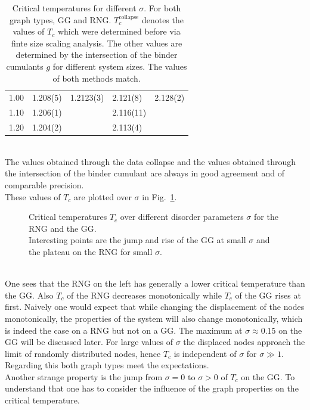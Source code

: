 \begin{table}[htbp]
\begin{tabular}{l l l l l}
            1.00 & 1.208(5) & 1.2123(3)& 2.121(8) & 2.128(2)\\
            1.10 & 1.206(1) &          & 2.116(11)&         \\
            1.20 & 1.204(2) &          & 2.113(4) &         \\
            \bottomrule
        \end{tabular}
        \caption[Critical Temperatures for Different $\sigma$]{
            Critical temperatures for different $\sigma$. For both graph
            types, GG and RNG. \(T_c^{\mathrm{collapse}}\) denotes the
            values of \(T_c\) which were determined before via finte
            size scaling analysis. The other values are determined by
            the intersection of the binder cumulants \(g\) for different
            system sizes. The values of both methods match.
        }
        \label{tab:critTemp}
    \end{table}\\
    The values obtained through the data collapse and the values obtained
    through the intersection of the binder cumulant are always in good
    agreement and of comparable precision.\\
    These values of \(T_c\) are plotted over \(\sigma\) in Fig.\ \ref{fig:Tc}.
    \begin{figure}[htbp]
        \centering
        \caption[Critical Temperature over Different Disorder Parameters]
        {
            Critical temperatures \(T_c\) over different
            disorder parameters \(\sigma\) for
             the RNG and
             the GG.\\
            Interesting points are the jump and rise of the GG at small
            \(\sigma\) and the plateau on the RNG for small \(\sigma\).
        }
        \label{fig:Tc}
    \end{figure}\\
    One sees that the RNG on the left has generally a lower critical
    temperature than the GG.
    Also \(T_c\) of the RNG decreases
    monotonically while \(T_c\) of the GG rises at first. Naively one would
    expect that while changing the displacement of the nodes monotonically,
    the properties of the system will also change monotonically, which is
    indeed the case on a RNG but not on a GG. The
    maximum at \(\sigma \approx 0.15\) on the GG will be discussed later.
    For large values of \(\sigma\) the displaced nodes approach the limit of randomly
    distributed nodes, hence \(T_c\) is independent of \(\sigma\) for
    \(\sigma \gg 1\). Regarding this both graph types meet the expectations.\\
    Another strange property is the jump from \(\sigma = 0\) to \(\sigma > 0\)
    of \(T_c\) on the GG. To understand that one has to
    consider the influence of the graph properties on the critical
    temperature.

